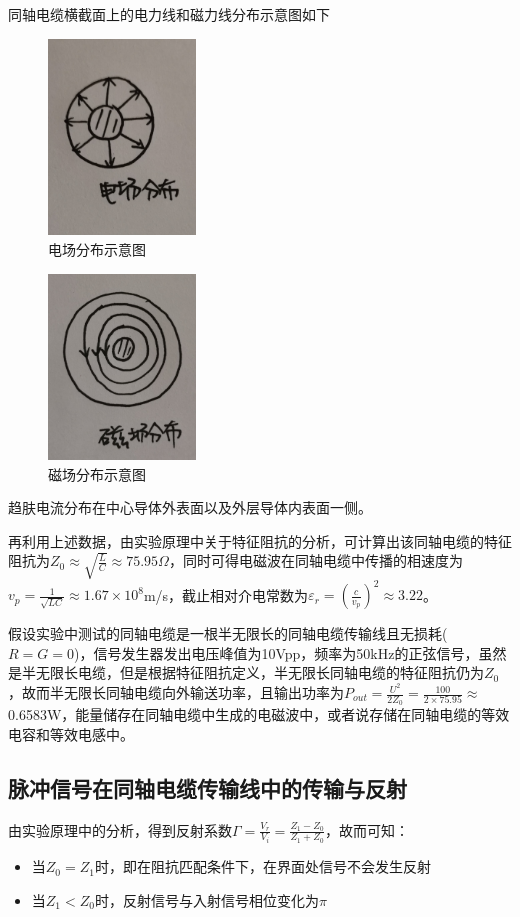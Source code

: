 \documentclass[UTF8]{ctexart}
\begin{document}
同轴电缆横截面上的电力线和磁力线分布示意图如下
\begin{figure}[H]
\centering
\includegraphics[width=0.35\textwidth]{AA.jpg}
\caption{电场分布示意图}
\end{figure}
\begin{figure}[H]
\centering
\includegraphics[width=0.35\textwidth]{BB.jpg}
\caption{磁场分布示意图}
\end{figure}
趋肤电流分布在中心导体外表面以及外层导体内表面一侧。

再利用上述数据，由实验原理中关于特征阻抗的分析，可计算出该同轴电缆的特征阻抗为$Z_0\approx \sqrt{\frac{L}{C}}\approx75.95\Omega$，同时可得电磁波在同轴电缆中传播的相速度为$v_p=\frac{1}{\sqrt{LC}}\approx1.67\times10^8$m/s，截止相对介电常数为$\varepsilon_r=(\frac{c}{v_p})^2\approx3.22$。

假设实验中测试的同轴电缆是一根半无限长的同轴电缆传输线且无损耗($R=G=0$)，信号发生器发出电压峰值为10Vpp，频率为50kHz的正弦信号，虽然是半无限长电缆，但是根据特征阻抗定义，半无限长同轴电缆的特征阻抗仍为$Z_0$，故而半无限长同轴电缆向外输送功率，且输出功率为$P_{out}=\frac{U^2}{2Z_0}=\frac{100}{2\times75.95}\approx$0.6583W，能量储存在同轴电缆中生成的电磁波中，或者说存储在同轴电缆的等效电容和等效电感中。
\subsection{脉冲信号在同轴电缆传输线中的传输与反射}
由实验原理中的分析，得到反射系数$\Gamma=\frac{V_r}{V_i}=\frac{Z_1-Z_0}{Z_1+Z_0}$，故而可知：
\begin{itemize}
\item 当$Z_0=Z_1$时，即在阻抗匹配条件下，在界面处信号不会发生反射
\item 当$Z_1<Z_0$时，反射信号与入射信号相位变化为$\pi$
\end{itemize}
\end{document}
